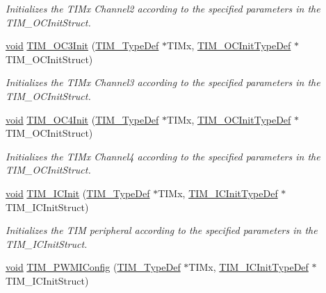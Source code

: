 \begin{DoxyCompactItemize}
\begin{DoxyCompactList}\small\item\em Initializes the T\+I\+Mx Channel2 according to the specified parameters in the T\+I\+M\+\_\+\+O\+C\+Init\+Struct. \end{DoxyCompactList}\item 
\hyperlink{usb__devapi_8h_afabf60e7f57651d6d595a02c75f07cd0}{void} \hyperlink{group___t_i_m___exported___functions_ga90d4a358d4e6d4c5ed17dc1d6beb5f30}{T\+I\+M\+\_\+\+O\+C3\+Init} (\hyperlink{struct_t_i_m___type_def}{T\+I\+M\+\_\+\+Type\+Def} $\ast$T\+I\+Mx, \hyperlink{struct_t_i_m___o_c_init_type_def}{T\+I\+M\+\_\+\+O\+C\+Init\+Type\+Def} $\ast$T\+I\+M\+\_\+\+O\+C\+Init\+Struct)
\begin{DoxyCompactList}\small\item\em Initializes the T\+I\+Mx Channel3 according to the specified parameters in the T\+I\+M\+\_\+\+O\+C\+Init\+Struct. \end{DoxyCompactList}\item 
\hyperlink{usb__devapi_8h_afabf60e7f57651d6d595a02c75f07cd0}{void} \hyperlink{group___t_i_m___exported___functions_ga64571ebbb58cac39a9e760050175f11c}{T\+I\+M\+\_\+\+O\+C4\+Init} (\hyperlink{struct_t_i_m___type_def}{T\+I\+M\+\_\+\+Type\+Def} $\ast$T\+I\+Mx, \hyperlink{struct_t_i_m___o_c_init_type_def}{T\+I\+M\+\_\+\+O\+C\+Init\+Type\+Def} $\ast$T\+I\+M\+\_\+\+O\+C\+Init\+Struct)
\begin{DoxyCompactList}\small\item\em Initializes the T\+I\+Mx Channel4 according to the specified parameters in the T\+I\+M\+\_\+\+O\+C\+Init\+Struct. \end{DoxyCompactList}\item 
\hyperlink{usb__devapi_8h_afabf60e7f57651d6d595a02c75f07cd0}{void} \hyperlink{group___t_i_m___exported___functions_ga9e6a153dd6552e4e1188eba227316f7f}{T\+I\+M\+\_\+\+I\+C\+Init} (\hyperlink{struct_t_i_m___type_def}{T\+I\+M\+\_\+\+Type\+Def} $\ast$T\+I\+Mx, \hyperlink{struct_t_i_m___i_c_init_type_def}{T\+I\+M\+\_\+\+I\+C\+Init\+Type\+Def} $\ast$T\+I\+M\+\_\+\+I\+C\+Init\+Struct)
\begin{DoxyCompactList}\small\item\em Initializes the T\+IM peripheral according to the specified parameters in the T\+I\+M\+\_\+\+I\+C\+Init\+Struct. \end{DoxyCompactList}\item 
\hyperlink{usb__devapi_8h_afabf60e7f57651d6d595a02c75f07cd0}{void} \hyperlink{group___t_i_m___exported___functions_gaa71f9296556310f85628d6c748a06475}{T\+I\+M\+\_\+\+P\+W\+M\+I\+Config} (\hyperlink{struct_t_i_m___type_def}{T\+I\+M\+\_\+\+Type\+Def} $\ast$T\+I\+Mx, \hyperlink{struct_t_i_m___i_c_init_type_def}{T\+I\+M\+\_\+\+I\+C\+Init\+Type\+Def} $\ast$T\+I\+M\+\_\+\+I\+C\+Init\+Struct)

\end{DoxyCompactItemize}
